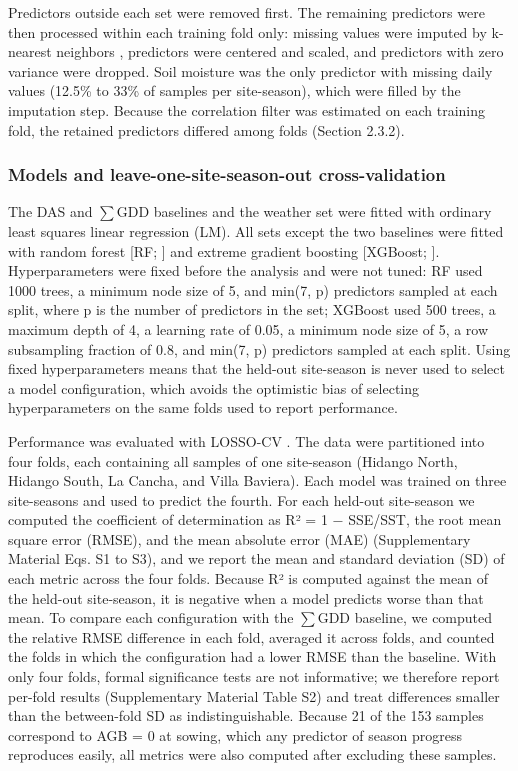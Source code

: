 \documentclass[
  english,
  review,
  number,
  sort,compress,
  authoryear,
  3p]{elsarticle}
\begin{document}
Predictors outside each set were removed first. The remaining predictors
were then processed within each training fold only: missing values were
imputed by k-nearest neighbors \citep{Gower1971}, predictors were
centered and scaled, and predictors with zero variance were dropped.
Soil moisture was the only predictor with missing daily values (12.5\%
to 33\% of samples per site-season), which were filled by the imputation
step. Because the correlation filter was estimated on each training
fold, the retained predictors differed among folds (Section 2.3.2).

\subsubsection{Models and leave-one-site-season-out
cross-validation}\label{models-and-leave-one-site-season-out-cross-validation}

The DAS and \(\sum\)GDD baselines and the weather set were fitted with
ordinary least squares linear regression (LM). All sets except the two
baselines were fitted with random forest {[}RF; \citet{Breiman2001}{]}
and extreme gradient boosting {[}XGBoost; \citet{Chen2016}{]}.
Hyperparameters were fixed before the analysis and were not tuned: RF
used 1000 trees, a minimum node size of 5, and min(7, p) predictors
sampled at each split, where p is the number of predictors in the set;
XGBoost used 500 trees, a maximum depth of 4, a learning rate of 0.05, a
minimum node size of 5, a row subsampling fraction of 0.8, and min(7, p)
predictors sampled at each split. Using fixed hyperparameters means that
the held-out site-season is never used to select a model configuration,
which avoids the optimistic bias of selecting hyperparameters on the
same folds used to report performance.

Performance was evaluated with LOSSO-CV \citep{Roberts2017, Meyer2021}.
The data were partitioned into four folds, each containing all samples
of one site-season (Hidango North, Hidango South, La Cancha, and Villa
Baviera). Each model was trained on three site-seasons and used to
predict the fourth. For each held-out site-season we computed the
coefficient of determination as R² = 1 − SSE/SST, the root mean square
error (RMSE), and the mean absolute error (MAE) (Supplementary Material
Eqs. S1 to S3), and we report the mean and standard deviation (SD) of
each metric across the four folds. Because R² is computed against the
mean of the held-out site-season, it is negative when a model predicts
worse than that mean. To compare each configuration with the \(\sum\)GDD
baseline, we computed the relative RMSE difference in each fold,
averaged it across folds, and counted the folds in which the
configuration had a lower RMSE than the baseline. With only four folds,
formal significance tests are not informative; we therefore report
per-fold results (Supplementary Material Table S2) and treat differences
smaller than the between-fold SD as indistinguishable. Because 21 of the
153 samples correspond to AGB = 0 at sowing, which any predictor of
season progress reproduces easily, all metrics were also computed after
excluding these samples.
\end{document}
